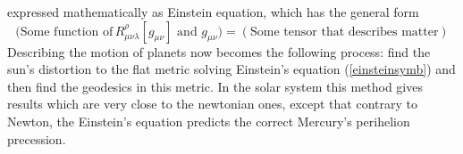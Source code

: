 expressed mathematically as Einstein equation, which has the general form
\begin{equation}
\label{einsteinsymb}
\mathrm{(Some \,\,function\,\, of }\,R_{\mu\nu\lambda}^\rho[g_{\mu\nu}] \mathrm{ \,\,and\,\, } g_{\mu\nu})= \mathrm{(Some\,\, tensor \,\,that\,\, describes\,\, matter)}
\end{equation}
Describing the motion of planets now becomes the following process: find the sun's distortion to the flat metric solving Einstein's equation (\ref{einsteinsymb}) and then find the geodesics in this metric. In the solar system this method gives results which are very close to the newtonian ones, except that contrary to Newton, the Einstein's equation predicts the correct Mercury's perihelion precession.